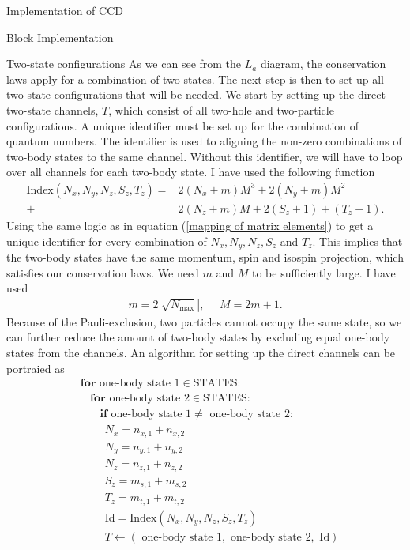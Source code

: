 \documentclass[twoside,english]{uiofysmaster}
\begin{document}
\begin{chapter}{Implementation of CCD}
\begin{section}{Block Implementation}
		\begin{subsection}{Two-state configurations}
			As we can see from the $L_a$ diagram, the conservation laws apply for a combination of two states. The next step is then to set up all two-state configurations that will be needed. We start by setting up the direct two-state channels, $T$, which consist of all two-hole and two-particle configurations. A unique identifier must be set up for the combination of quantum numbers. The identifier is used to aligning the non-zero combinations of two-body states to the same channel. Without this identifier, we will have to loop over all channels for each two-body state. I have used the following function 
			\begin{align}
				\text{Index}(N_x,N_y,N_z,S_z,T_z) = &2(N_x + m)M^3 + 2(N_y+m)M^2 \\+&  2(N_z+m)M + 2(S_z+1) + (T_z+1). \nonumber
			\end{align}
			Using the same logic as in equation (\ref{mapping of matrix elements}) to get a unique identifier for every combination of $N_x,N_y,N_z,S_z$ and $T_z$. This implies that the two-body states have the same momentum, spin and isospin projection, which satisfies our conservation laws. We need $m$ and $M$ to be sufficiently large. I have used
			\begin{align}
				m = 2|\sqrt{N_{\text{max}}}|, \:\:\:\:\:\: M = 2m +1.
			\end{align}
			Because of the Pauli-exclusion, two particles cannot occupy the same state, so we can further reduce the amount of two-body states by excluding equal one-body states from the channels. An algorithm for setting up the direct channels can be portraied as
			\begin{align*}
				&\mathbf{for } \text{ one-body state 1} \in \text{STATES}: \\
				&\:\:\:\: \mathbf{for } \text{ one-body state 2} \in \text{STATES}: \\
				&\:\:\:\:\:\:\:\: \mathbf{if} \text{ one-body state 1} \neq \text{ one-body state 2}: \\
				&\:\:\:\:\:\:\:\:\:\: N_x = n_{x,1} + n_{x,2} \\
				&\:\:\:\:\:\:\:\:\:\: N_y = n_{y,1} + n_{y,2} \\
				&\:\:\:\:\:\:\:\:\:\: N_z = n_{z,1} + n_{z,2} \\
 				&\:\:\:\:\:\:\:\:\:\: S_z = m_{s,1} + m_{s,2} \\
				&\:\:\:\:\:\:\:\:\:\: T_z = m_{t,1} + m_{t,2} \\
				&\:\:\:\:\:\:\:\:\:\: \text{Id} = \text{Index}(N_x,N_y,N_z,S_z,T_z) \\
				&\:\:\:\:\:\:\:\:\:\: T \leftarrow (\text{ one-body state 1}, \text{ one-body state 2}, \text{ Id})
			\end{align*}


\end{subsection}
\end{section}
\end{chapter}
\end{document}
